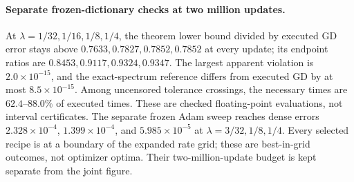 \paragraph{Separate frozen-dictionary checks at two million updates.}
At $\lambda=1/32,1/16,1/8,1/4$, the theorem lower bound divided by executed
GD error stays above $0.7633,0.7827,0.7852,0.7852$ at every update; its
endpoint ratios are $0.8453,0.9117,0.9324,0.9347$. The largest apparent
violation is $2.0\times10^{-15}$, and the exact-spectrum reference differs
from executed GD by at most $8.5\times10^{-15}$. Among uncensored tolerance
crossings, the necessary times are $62.4$--$88.0\%$ of executed times.
These are checked floating-point evaluations, not interval certificates.
The separate frozen Adam sweep reaches dense errors
$2.328\times10^{-4}$, $1.399\times10^{-4}$, and $5.985\times10^{-5}$ at
$\lambda=3/32,1/8,1/4$. Every selected recipe is at a boundary of the
expanded rate grid; these are best-in-grid outcomes, not optimizer optima.
Their two-million-update budget is kept separate from the joint figure.
